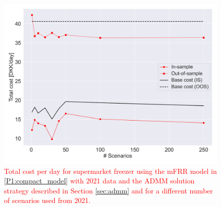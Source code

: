 \documentclass[11pt,a4paper]{article}
\begin{document}
\begin{figure}[!t]
    \centering
    \includegraphics[width=\columnwidth]{figures/admm_nb_scenarios_effect.png}
    \caption{\textcolor{red}{Total cost per day for supermarket freezer using the mFRR model in \eqref{P1:compact_model} with 2021 data and the ADMM solution strategy described in Section \ref{sec:admm} and for a different number of scenarios used from 2021.}}
    \label{fig:admm_sensitivity}
\end{figure}

%
\printbibliography


\end{document}
